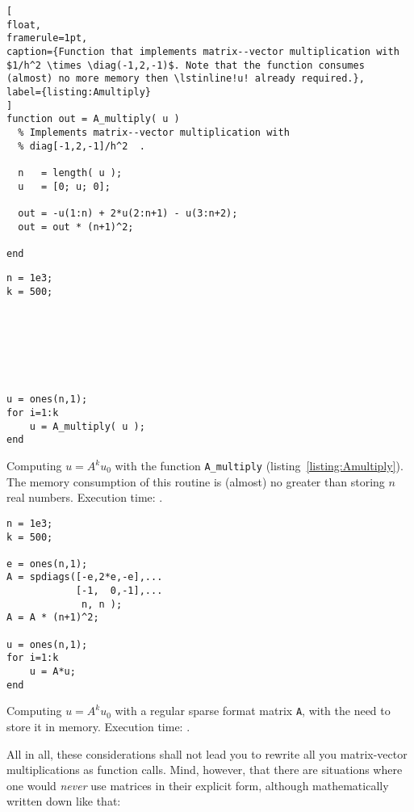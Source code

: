 \begin{lstlisting}[
float,
framerule=1pt,
caption={Function that implements matrix--vector multiplication with $1/h^2 \times \diag(-1,2,-1)$. Note that the function consumes (almost) no more memory then \lstinline!u! already required.},
label={listing:Amultiply}
]
function out = A_multiply( u )
  % Implements matrix--vector multiplication with
  % diag[-1,2,-1]/h^2  .

  n   = length( u );
  u   = [0; u; 0];

  out = -u(1:n) + 2*u(2:n+1) - u(3:n+2);
  out = out * (n+1)^2;

end
\end{lstlisting}


\hfill
\begin{minipage}[t]{.45\textwidth}
\begin{lstlisting}[framerule=1pt]
n = 1e3;
k = 500;







u = ones(n,1);
for i=1:k
    u = A_multiply( u );
end
\end{lstlisting}
Computing $u = A^ku_0$ with the function \lstinline!A_multiply!
(listing~\ref{listing:Amultiply}). The memory consumption of this routine is
(almost) no greater than storing $n$ real numbers. Execution time:
.
\end{minipage}
\hfill
\begin{minipage}[t]{.45\textwidth}
\begin{lstlisting}[framerule=1pt]
n = 1e3;
k = 500;

e = ones(n,1);
A = spdiags([-e,2*e,-e],...
            [-1,  0,-1],...
             n, n );
A = A * (n+1)^2;

u = ones(n,1);
for i=1:k
    u = A*u;
end
\end{lstlisting}
Computing $u = A^ku_0$ with a regular sparse format matrix \lstinline!A!, with the need to store it in memory. Execution time: .
\end{minipage}
\hfill

All in all, these considerations shall not lead you to rewrite all you
matrix-vector multiplications as function calls. Mind, however, that there are
situations where one would \emph{never} use matrices in their explicit form,
although mathematically written down like that:

